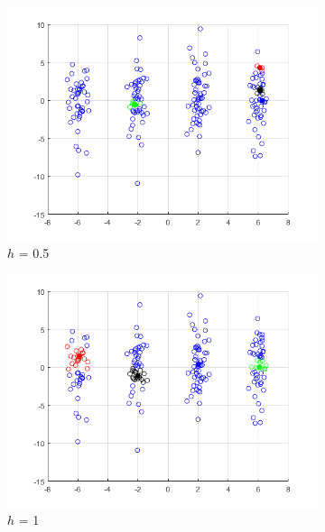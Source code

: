 \documentclass[12pt]{article}
\begin{document}
\begin{figure}[H]
    \centering %
\begin{subfigure}{0.25\textwidth}
  \includegraphics[width=\linewidth]{figs/1-b-meanshift-b-0.png}
  \caption{$h$ = 0.5}
  \label{fig:1}
\end{subfigure}\hfil %
\begin{subfigure}{0.25\textwidth}
  \includegraphics[width=\linewidth]{figs/1-b-meanshift-b-1.png}
  \caption{$h$ = 1}
  \label{fig:2}
\end{subfigure}\hfil %
\begin{subfigure}{0.25\textwidth}

\end{subfigure}
\end{figure}
\end{document}
